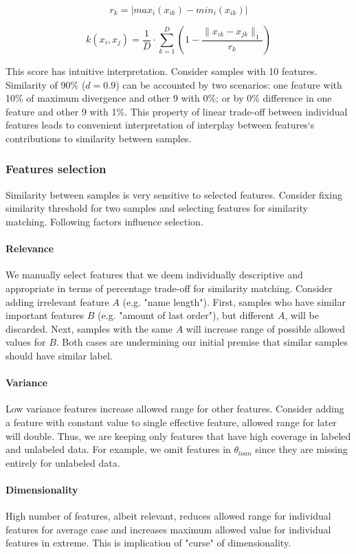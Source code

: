 \documentclass{article}
\begin{document}
$$
r_k = |max_i(x_{ik}) - min_i(x_{ik})|
$$

$$
k(x_i, x_j) = \frac{1}{D} \cdot \sum_{k=1}^{D} (1 - \frac{\|x_{ik} - x_{jk}\|_{1}}{r_k})
$$

This score has intuitive interpretation. Consider samples with 10 features. Similarity of 90\% ($d = 0.9$) can be accounted by two scenarios: one feature with 10\% of maximum divergence and other 9 with 0\%; or by 0\% difference in one feature and other 9 with 1\%. This property of linear trade-off between individual features leads to convenient interpretation of interplay between features`s contributions to similarity between samples.

\subsubsection{Features selection}
Similarity between samples is very sensitive to selected features. Consider fixing similarity threshold for two samples and selecting features for similarity matching. Following factors influence selection.

\paragraph{Relevance}
We manually select features that we deem individually descriptive and appropriate in terms of percentage trade-off for similarity matching. Consider adding irrelevant feature $A$ (e.g. "name length"). First, samples who have similar important features $B$ (e.g. "amount of last order"), but different $A$, will be discarded. Next, samples with the same $A$ will increase range of possible allowed values for $B$. Both cases are undermining our initial premise that similar samples should have similar label.

\paragraph{Variance}
Low variance features increase allowed range for other features. Consider adding a feature with constant value to single effective feature, allowed range for later will double. Thus, we are keeping only features that have high coverage in labeled and unlabeled data. For example, we omit features in $\theta_{loan}$ since they are missing entirely for unlabeled data.

\paragraph{Dimensionality}
High number of features, albeit relevant, reduces allowed range for individual features for average case and increases maximum allowed value for individual features in extreme. This is implication of "curse" of dimensionality.
\end{document}
